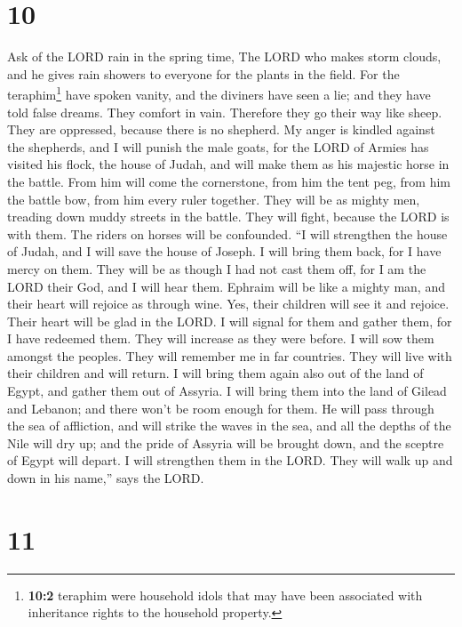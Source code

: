 \hypertarget{section-9}{%
\section{10}\label{section-9}}

 Ask of the LORD rain in the spring time, The LORD who
makes storm clouds, and he gives rain showers to everyone for the plants
in the field.  For the teraphim\footnote{\textbf{10:2}
  teraphim were household idols that may have been associated with
  inheritance rights to the household property.} have spoken vanity, and
the diviners have seen a lie; and they have told false dreams. They
comfort in vain. Therefore they go their way like sheep. They are
oppressed, because there is no shepherd.  My anger is
kindled against the shepherds, and I will punish the male goats, for the
LORD of Armies has visited his flock, the house of Judah, and will make
them as his majestic horse in the battle.  From him will
come the cornerstone, from him the tent peg, from him the battle bow,
from him every ruler together.  They will be as mighty
men, treading down muddy streets in the battle. They will fight, because
the LORD is with them. The riders on horses will be confounded.
 ``I will strengthen the house of Judah, and I will save
the house of Joseph. I will bring them back, for I have mercy on them.
They will be as though I had not cast them off, for I am the LORD their
God, and I will hear them.  Ephraim will be like a mighty
man, and their heart will rejoice as through wine. Yes, their children
will see it and rejoice. Their heart will be glad in the LORD.
 I will signal for them and gather them, for I have
redeemed them. They will increase as they were before.  I
will sow them amongst the peoples. They will remember me in far
countries. They will live with their children and will return.
 I will bring them again also out of the land of Egypt,
and gather them out of Assyria. I will bring them into the land of
Gilead and Lebanon; and there won't be room enough for them.
 He will pass through the sea of affliction, and will
strike the waves in the sea, and all the depths of the Nile will dry up;
and the pride of Assyria will be brought down, and the sceptre of Egypt
will depart.  I will strengthen them in the LORD. They
will walk up and down in his name,'' says the LORD.

\hypertarget{section-10}{%
\section{11}\label{section-10}}

